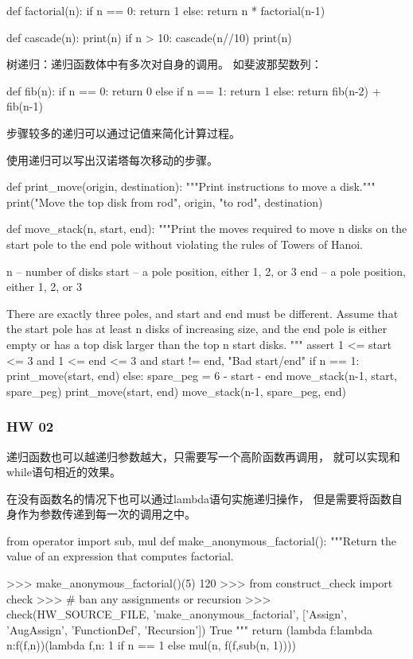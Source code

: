 \documentclass{ctexart}
\begin{document}
\begin{python}
    def factorial(n):
        if n == 0:
            return 1
        else:
            return n * factorial(n-1)
\end{python}

\begin{python}
    def cascade(n):
        print(n)
        if n > 10:
            cascade(n//10)
            print(n)
\end{python}

树递归：递归函数体中有多次对自身的调用。
如斐波那契数列：
\begin{python}
    def fib(n):
        if n == 0:
            return 0
        else if n == 1:
            return 1
        else:
            return fib(n-2) + fib(n-1)
\end{python}
步骤较多的递归可以通过记值来简化计算过程。

使用递归可以写出汉诺塔每次移动的步骤。
\begin{python}
    def print_move(origin, destination):
    """Print instructions to move a disk."""
    print("Move the top disk from rod", origin, "to rod", destination)

def move_stack(n, start, end):
    """Print the moves required to move n disks on the start pole to the end
    pole without violating the rules of Towers of Hanoi.

    n -- number of disks
    start -- a pole position, either 1, 2, or 3
    end -- a pole position, either 1, 2, or 3

    There are exactly three poles, and start and end must be different. Assume
    that the start pole has at least n disks of increasing size, and the end
    pole is either empty or has a top disk larger than the top n start disks.
    """
    assert 1 <= start <= 3 and 1 <= end <= 3 and start != end, "Bad start/end"
    if n == 1:
        print_move(start, end)
    else:
        spare_peg = 6 - start - end
        move_stack(n-1, start, spare_peg)
        print_move(start, end)
        move_stack(n-1, spare_peg, end)
\end{python}

\subsubsection{HW 02}

递归函数也可以越递归参数越大，只需要写一个高阶函数再调用，
就可以实现和while语句相近的效果。

在没有函数名的情况下也可以通过lambda语句实施递归操作，
但是需要将函数自身作为参数传递到每一次的调用之中。
\begin{python}
    from operator import sub, mul
    def make_anonymous_factorial():
    """Return the value of an expression that computes factorial.

    >>> make_anonymous_factorial()(5)
    120
    >>> from construct_check import check
    >>> # ban any assignments or recursion
    >>> check(HW_SOURCE_FILE, 'make_anonymous_factorial', ['Assign', 'AugAssign', 'FunctionDef', 'Recursion'])
    True
    """
    return (lambda f:lambda n:f(f,n))(lambda f,n: 1 if n == 1 else mul(n, f(f,sub(n, 1))))
\end{python}
\end{document}
